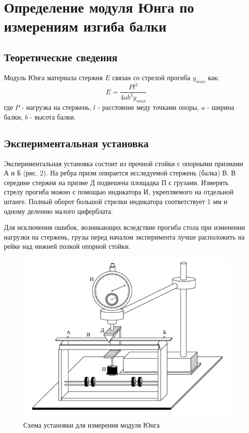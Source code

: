 \documentclass[12pt]{article}
\begin{document}
    \section{Определение модуля Юнга по измерениям изгиба балки}
    \subsection{Теоретические сведения}
    Модуль Юнга материала стержня $E$ связан со стрелой прогиба $y_{max}$ как:
    \begin{equation}\label{balka}
        E=\frac{Pl^3}{4ab^3y_{max}}
    \end{equation}
    где $P$ - нагрузка на стержень, $l$ - расстояние меду точками опоры,
    $a$ - ширина балки, $b$ - высота балки.

    \subsection{Экспериментальная установка}
    Экспериментальная установка состоит из прочной стойки с
    опорными призмами А и Б (рис. 2). На ребра призм опирается исследуемой
    стержень (балка) В. В середине стержня на призме Д подвешена площадка
    П с грузами. Измерять стрелу прогиба можно с помощью индикатора И, укрепляемого
    на отдельной штанге. Полный оборот большой
    стрелки индикатора соответствует 1 мм и одному делению малого циферблата.
    \par Для исключения ошибок, возникающих вследствие прогиба стола
    при изменении нагрузки на стержень, грузы перед началом эксперимента
    лучше расположить на рейке над нижней полкой опорной стойки.
    \begin{figure}[H]
        \centering
        \includegraphics[scale = 0.3]{pictures/balka.png}
        \caption{Схема установки для измерения модуля Юнга}
    \end{figure}
\end{document}
